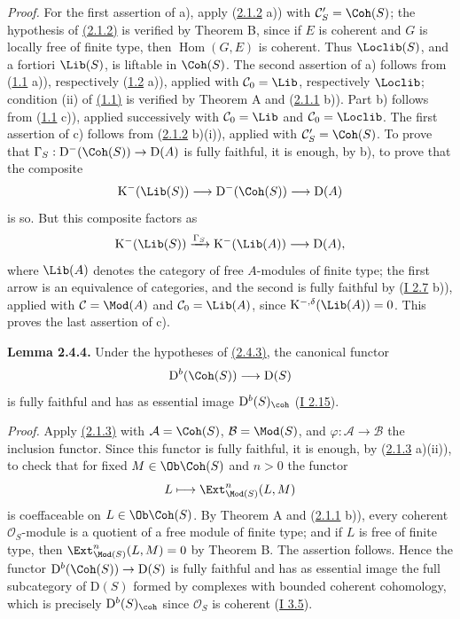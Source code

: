 \emph{Proof.} For the first assertion of a), apply (\hyperlink{sga6.e02.lem.2-1-2}{2.1.2} a)) with $\mathcal C'_S=\Coh(S)$; the hypothesis of \hyperlink{sga6.e02.lem.2-1-2}{(2.1.2)} is verified by Theorem B, since if $E$ is coherent and $G$ is locally free of finite type, then $\operatorname{Hom}(G,E)$ is coherent. Thus $\Loclib(S)$, and a fortiori $\Lib(S)$, is liftable in $\Coh(S)$. The second assertion of a) follows from (\hyperlink{sga6.e02.prop.1-1}{1.1} a)), respectively (\hyperlink{sga6.e02.prop.1-2}{1.2} a)), applied with $\mathcal C_0=\Lib$, respectively $\Loclib$; condition (ii) of \hyperlink{sga6.e02.prop.1-1}{(1.1)} is verified by Theorem A and (\hyperlink{sga6.e02.lem.2-1-1}{2.1.1} b)). Part b) follows from (\hyperlink{sga6.e02.prop.1-1}{1.1} c)), applied successively with $\mathcal C_0=\Lib$ and $\mathcal C_0=\Loclib$. The first assertion of c) follows from (\hyperlink{sga6.e02.lem.2-1-2}{2.1.2} b)(i)), applied with $\mathcal C'_S=\Coh(S)$. To prove that $\Gamma_S:\mathrm D^{-}(\Coh(S))\to\mathrm D(A)$ is fully faithful, it is enough, by b), to prove that the composite
\[
\mathrm K^{-}(\Lib(S))\longrightarrow\mathrm D^{-}(\Coh(S))\longrightarrow\mathrm D(A)
\]
is so. But this composite factors as
\[
\mathrm K^{-}(\Lib(S))\xrightarrow{\Gamma_S}\mathrm K^{-}(\Lib(A))\longrightarrow\mathrm D(A),
\]
where $\Lib(A)$ denotes the category of free $A$-modules of finite type; the first arrow is an equivalence of categories, and the second is fully faithful by (\hyperlink{sga6.e01.prop.2-7}{I 2.7} b)), applied with $\mathcal C=\Mod(A)$ and $\mathcal C_0=\Lib(A)$, since $\mathrm K^{-,\delta}(\Lib(A))=0$. This proves the last assertion of c).

\textbf{Lemma 2.4.4.} Under the hypotheses of \hyperlink{sga6.e02.lem.2-4-3}{(2.4.3)}, the canonical functor
\[
\mathrm D^b(\Coh(S))\longrightarrow\mathrm D(S)
\]
is fully faithful and has as essential image $\mathrm D^b(S)_{\coh}$ (\hyperlink{sga6.e01.ex.2-15}{I 2.15}).

\emph{Proof.} Apply \hyperlink{sga6.e02.lem.2-1-3}{(2.1.3)} with $\mathcal A=\Coh(S)$, $\mathcal B=\Mod(S)$, and $\varphi:\mathcal A\to\mathcal B$ the inclusion functor. Since this functor is fully faithful, it is enough, by (\hyperlink{sga6.e02.lem.2-1-3}{2.1.3} a)(ii)), to check that for fixed $M\in\Ob\Coh(S)$ and $n>0$ the functor
\[
L\longmapsto \Ext^n_{\Mod(S)}(L,M)
\]
is coeffaceable on $L\in\Ob\Coh(S)$. By Theorem A and (\hyperlink{sga6.e02.lem.2-1-1}{2.1.1} b)), every coherent $\mathcal O_S$-module is a quotient of a free module of finite type; and if $L$ is free of finite type, then $\Ext^n_{\Mod(S)}(L,M)=0$ by Theorem B. The assertion follows. Hence the functor $\mathrm D^b(\Coh(S))\to\mathrm D(S)$ is fully faithful and has as essential image the full subcategory of $\mathrm D(S)$ formed by complexes with bounded coherent cohomology, which is precisely $\mathrm D^b(S)_{\coh}$ since $\mathcal O_S$ is coherent (\hyperlink{sga6.e01.cor.3-5}{I 3.5}).


